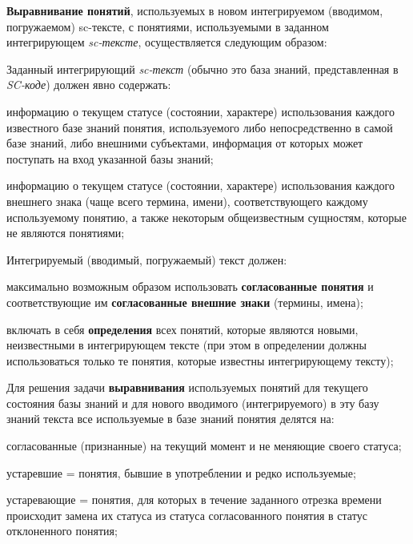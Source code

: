 \begin{SCn}
{\textbf{Выравнивание понятий}, используемых в новом интегрируемом (вводимом, погружаемом) sc-тексте, с понятиями, используемыми в заданном интегрирующем \textit{sc-тексте}, осуществляется следующим образом:
\begin{scnitemize}
    \item Заданный интегрирующий \textit{sc-текст} (обычно это база знаний, представленная в \textit{SC-коде}) должен явно содержать:
    \begin{scnitemizeii}
        \item информацию о текущем статусе (состоянии, характере) использования каждого известного базе знаний понятия, используемого либо непосредственно в самой базе знаний, либо внешними субъектами, информация от которых может поступать на вход указанной базы знаний;
        \item информацию о текущем статусе (состоянии, характере) использования каждого внешнего знака (чаще всего термина, имени), соответствующего каждому используемому понятию, а также некоторым общеизвестным сущностям, которые не являются понятиями;
    \end{scnitemizeii}
    \item Интегрируемый (вводимый, погружаемый) текст должен:
    \begin{scnitemizeii}
        \item максимально возможным образом использовать \textbf{согласованные понятия} и соответствующие им \textbf{согласованные внешние знаки} (термины, имена);
        \item включать в себя \textbf{определения} всех понятий, которые являются новыми, неизвестными в интегрирующем тексте (при этом в определении должны использоваться только те понятия, которые известны интегрирующему тексту);
    \end{scnitemizeii}
    \item Для решения задачи \textbf{выравнивания} используемых понятий для текущего состояния базы знаний и для нового вводимого (интегрируемого) в эту базу знаний текста все используемые в базе знаний понятия делятся на:
    \begin{scnitemizeii}
        \item согласованные (признанные) на текущий момент и не меняющие своего статуса;
        \item устаревшие = понятия, бывшие в употреблении и редко используемые;
        \item устаревающие = понятия, для которых в течение заданного отрезка времени происходит замена их статуса из статуса согласованного понятия в статус отклоненного понятия;

\end{scnitemizeii}
\end{scnitemize}}
\end{SCn}
